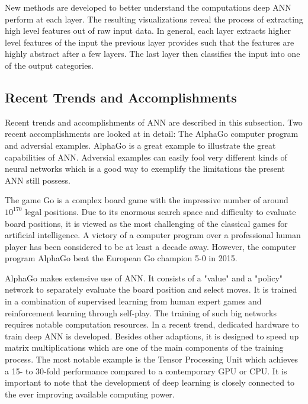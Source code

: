 New methods are developed to better understand the computations deep ANN perform at each layer. The resulting visualizations reveal the process of extracting high level features out of raw input data\cite{mordvintsev2015}\cite{yosinski2015understanding}. In general, each layer extracts higher level features of the input the previous layer provides such that the features are highly abstract after a few layers. The last layer then classifies the input into one of the output categories.

\subsection{Recent Trends and Accomplishments}\label{subsec:trends}

Recent trends and accomplishments of ANN are described in this subsection. Two recent accomplishments are looked at in detail: The AlphaGo computer program and adversial examples. AlphaGo is a great example to illustrate the great capabilities of ANN. Adversial examples can easily fool very different kinds of neural networks which is a good way to exemplify the limitations the present ANN still possess. 

The game Go is a complex board game with the impressive number of around $10^{170}$ legal positions\cite{tromp2006combinatorics}. Due to its enormous search space and difficulty to evaluate board positions, it is viewed as the most challenging of the classical games for artificial intelligence. A victory of a computer program over a professional human player has been considered to be at least a decade away. However, the computer program AlphaGo beat the European Go champion 5-0 in 2015\cite{silver2016mastering}.

AlphaGo makes extensive use of ANN. It consists of a "value" and a "policy" network to separately evaluate the board position and select moves. It is trained in a combination of supervised learning from human expert games and reinforcement learning through self-play. The training of such big networks requires notable computation resources. In a recent trend, dedicated hardware to train deep ANN is developed. Besides other adaptions, it is designed to speed up matrix multiplications which are one of the main components of the training process. The most notable example is the Tensor Processing Unit which achieves a 15- to 30-fold performance compared to a contemporary GPU or CPU\cite{jouppi2017datacenter}. It is important to note that the development of deep learning is closely connected to the ever improving available computing power\cite{chen2016evolution}. 

